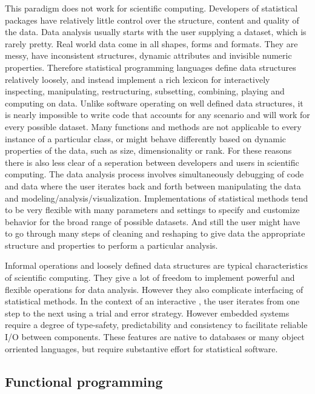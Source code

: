 This paradigm does not work for scientific computing. Developers of statistical packages have relatively little control over the structure, content and quality of the data. Data analysis usually starts with the user supplying a dataset, which is rarely pretty. Real world data come in all shapes, forms and formats. They are messy, have inconsistent structures, dynamic attributes and invisible numeric properties. Therefore statistical programming languages define data structures relatively loosely, and instead implement a rich lexicon for interactively inspecting, manipulating, restructuring, subsetting, combining, playing and computing on data. Unlike software operating on well defined data structures, it is nearly impossible to write code that accounts for any scenario and will work for every possible dataset. Many functions and methods are not applicable to every instance of a particular class, or might behave differently based on dynamic properties of the data, such as size, dimensionality or rank. For these reasons there is also less clear of a seperation between developers and users in scientific computing. The data analysis process involves simultaneously debugging of code and data where the user iterates back and forth between manipulating the data and modeling/analysis/visualization. Implementations of statistical methods tend to be very flexible with many parameters and settings to specify and customize behavior for the broad range of possible datasets. And still the user might have to go through many steps of cleaning and reshaping to give data the appropriate structure and properties to perform a particular analysis. 

Informal operations and loosely defined data structures are typical characteristics of scientific computing. They give a lot of freedom to implement powerful and flexible operations for data analysis. However they also complicate interfacing of statistical methods. In the context of an interactive \UI, the user iterates from one step to the next using a trial and error strategy. However embedded systems require a degree of type-safety, predictability and consistency to facilitate reliable I/O between components. These features are native to databases or many object orriented languages, but require substantive effort for statistical software. 


\subsection{Functional programming}

